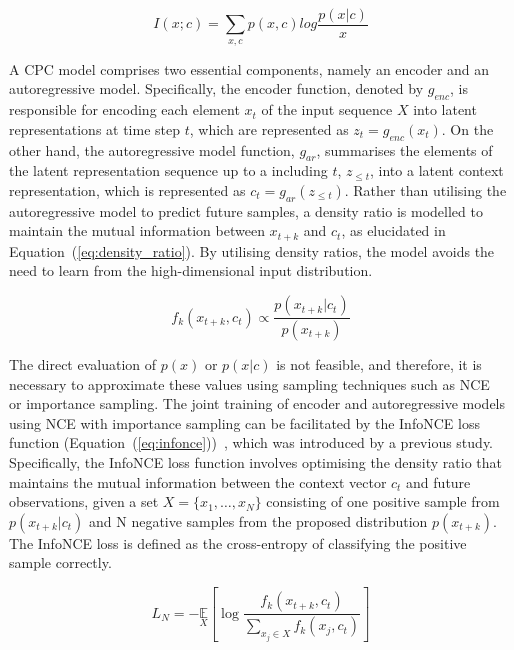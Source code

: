 \begin{equation}
	I(x;c) = \sum_{x, c}p(x, c) log \frac{p(x|c)}{x}
	\label{eq:mutual_infotmation_cpc}
\end{equation}

A CPC model comprises two essential components, namely an encoder and an autoregressive model. Specifically, the encoder function, denoted by $g_{enc}$, is responsible for encoding each element $x_t$ of the input sequence $X$ into latent representations at time step $t$, which are represented as $z_t = g_{enc}(x_t)$. On the other hand, the autoregressive model function, $g_{ar}$, summarises the elements of the latent representation sequence up to a including $t$, $z_{\le t}$, into a latent context representation, which is represented as $c_t = g_{ar}(z_{\le t})$. Rather than utilising the autoregressive model to predict future samples, a density ratio is modelled to maintain the mutual information between $x_{t+k}$ and $c_t$, as elucidated in Equation~(\ref{eq:density_ratio}). By utilising density ratios, the model avoids the need to learn from the high-dimensional input distribution.

\begin{equation}
	f_k(x_{t+k},c_t) \propto \frac{p(x_{t+k}|c_t)}{p(x_{t+k})}
	\label{eq:density_ratio}
\end{equation}

The direct evaluation of $p(x)$ or $p(x|c)$ is not feasible, and therefore, it is necessary to approximate these values using sampling techniques such as NCE~\citep{gutmann2010noise} or importance sampling. The joint training of encoder and autoregressive models using NCE with importance sampling can be facilitated by the InfoNCE loss function (Equation~(\ref{eq:infonce}))~\citep{oord2018representation}, which was introduced by a previous study. Specifically, the InfoNCE loss function involves optimising the density ratio that maintains the mutual information between the context vector $c_t$ and future observations, given a set $X = \{x_1,…,x_N\}$ consisting of one positive sample from $p(x_{t+k}|c_t)$ and N negative samples from the proposed distribution $p(x_{t+k})$. The InfoNCE loss is defined as the cross-entropy of classifying the positive sample correctly.

\begin{equation}
	L_N=-\underset{X}{\mathbb{E}}\left[\log\frac{f_k(x_{t+k},c_t)}{\sum_{x_j\in X}f_k(x_j,c_t)}\right]
	\label{eq:infonce}
\end{equation}


